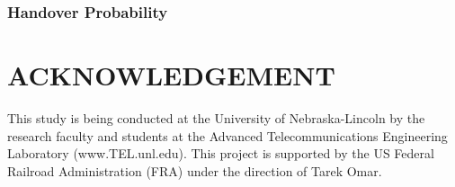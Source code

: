 \documentclass[twocolumn,10pt]{asme2e}
\begin{document}
\subsubsection*{Handover Probability}




\section*{ACKNOWLEDGEMENT}
This study is being conducted at the University of Nebraska-Lincoln by the research faculty and students at the Advanced Telecommunications Engineering Laboratory (www.TEL.unl.edu). This project is supported by the US Federal Railroad Administration (FRA) under the direction of Tarek Omar. 


\end{document}
